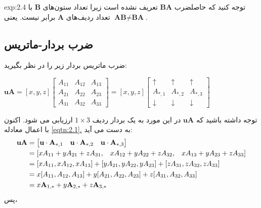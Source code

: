 {\begin{spacing}{1.5}
\begin{example}{exp:2.4}
            توجه کنید که حاصلضرب $\textbf{BA}$ تعریف نشده است زیرا تعداد ستون‌های $\textbf{B}$ با تعداد ردیف‌های $\textbf{A}$ برابر نیست. یعنی $\textbf{AB}\neq\textbf{BA}$.
        \end{example}

    \end{spacing}
}

\subsection{\textbf{ضرب بردار-ماتریس}}
\label{subsec:2.2.2}
{
    \Large
    \begin{spacing}{1.5}
        ضرب ماتریس بردار زیر را در نظر بگیرید:

        \begin{center}
            $\textbf{uA}=[x,y,z]\begin{bmatrix}
                                    A_{11} & A_{12} & A_{13} \\
                                    A_{21} & A_{22} & A_{23} \\
                                    A_{31} & A_{32} & A_{33}
            \end{bmatrix}=[x,y,z]\begin{bmatrix}
                                     \uparrow   & \uparrow   & \uparrow   \\
                                     A_{*,1}    & A_{*,2}    & A_{*,3}    \\
                                     \downarrow & \downarrow & \downarrow
            \end{bmatrix}$
        \end{center}

        توجه داشته باشید که $\textbf{uA}$ در این مورد به یک بردار ردیف $1\times 3$ ارزیابی می شود.
        اکنون با اعمال معادله \hyperref[eqtn:2.1]{\ref{eqtn:2.1}.} به دست می آید:
        \begin{equation*}
            \centering
            \begin{split}
                \textbf{uA}&=\begin{bmatrix}
                                 \textbf{u}\cdot\textbf{A}_{*,1} & \textbf{u}\cdot\textbf{A}_{*,2} & \textbf{u}\cdot\textbf{A}_{*,3}
                \end{bmatrix}\\
                &=[xA_{11}+yA_{21}+zA_{31},\hspace{3 mm} xA_{12}+yA_{22}+zA_{32},\hspace{3 mm} xA_{13}+yA_{23}+zA_{33}] \\
                &=[xA_{11},xA_{12},xA_{13}]+[yA_{21},yA_{22},yA_{23}]+[zA_{31},zA_{32},zA_{33}] \\
                &=x[A_{11},A_{12},A_{13}]+y[A_{21},A_{22},A_{23}]+z[A_{31},A_{32},A_{33}] \\
                &=x\textbf{A}_{1,*}+y\textbf{A}_{2,*}+z\textbf{A}_{3,*}
            \end{split}
        \end{equation*}
        پس،


\end{spacing}}
